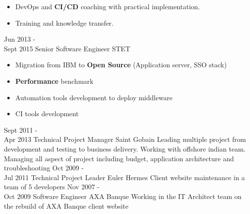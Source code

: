 \documentclass[]{friggeri-cv}
\begin{document}
\begin{entrylist}
{\begin{itemize}[wide]
			\item DevOps and \textbf{CI/CD} coaching with practical implementation. 
			\item Training and knowledge transfer.
		\end{itemize}
		}	
	\entryDate
	 	{Jun 2013 - \\  Sept 2015}
		{Senior Software Engineer}
		{STET}
		{	\vspace{-10pt}
			\begin{itemize}[wide]
			\item Migration from IBM to \textbf{Open Source} (Application server, SSO stack)			
			\item \textbf{Performance} benchmark 
		 	\item Automation tools development to deploy middleware 
		 	\item CI tools development 
	 	\end{itemize}
	 	} 
	\entryDate
		{Sept 2011 - \\ Apr 2013}
		{Technical Project Manager}
		{Saint Gobain}
		{
			Leading multiple project from development and testing to business delivery. Working with offshore indian team. Managing all aspect of project including budget, application architecture and troubleshooting }
	\entryDate
		{Oct 2009 - \\ Jul 2011}    
		{Technical Project Leader}
		{Euler Hermes}
		{Client website maintenance in a team of 5 developers }
	\entryDate
		{Nov 2007 - \\ Oct 2009}
		{Software Engineer}
		{AXA Banque}
		{Working in the IT Architect team on the rebuild of AXA Banque client website}
	\end{entrylist}
\setlength{\parsep}{\parsepsave}%
\\
\newpage
\end{document}
